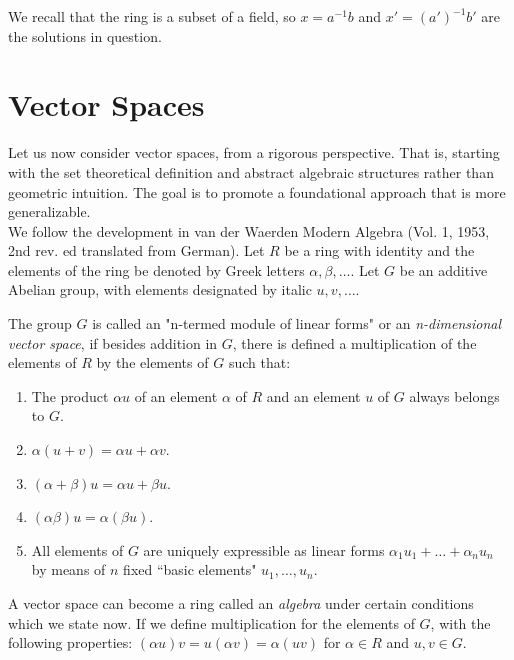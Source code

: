 We recall that the ring is a subset of a field, so $x=a^{-1}b$ and $x'=\left(a'\right)^{-1}b'$ are the solutions in question.

\section{Vector Spaces}

Let us now consider vector spaces, from a rigorous perspective.  That is, starting with the set theoretical definition and abstract algebraic structures rather than geometric intuition.  The goal is to promote a foundational approach that is more generalizable.\\

We follow the development in van der Waerden Modern Algebra (Vol. 1, 1953, 2nd rev. ed translated from German).  Let $R$ be a ring with identity and the elements of the ring be denoted by Greek letters $\alpha, \beta, \ldots $.  Let $G$ be an additive Abelian group, with elements designated by italic $u,v, \ldots$.

The group $G$ is called an "n-termed module of linear forms" or an \textit{n-dimensional vector space}, if besides addition in $G$, there is defined a multiplication of the elements of $R$ by the elements of $G$ such that:\\

\begin{enumerate}
\item The product $\alpha u$ of an element $\alpha$ of $R$ and an element $u$ of $G$ always belongs to $G$.
\item $\alpha \left(u+v\right)=\alpha u + \alpha v$.
\item $\left(\alpha + \beta\right) u =\alpha u + \beta u$.
\item $\left(\alpha \beta \right)u=\alpha\left(\beta u\right)$.
\item All elements of $G$ are uniquely expressible as linear forms $\alpha_{1}u_{1}+\ldots+ \alpha_{n}u_{n}$ by means of $n$ fixed ``basic elements" $u_{1}, \ldots, u_{n}$.
\end{enumerate}

A vector space can become a ring called an \textit{algebra} under certain conditions which we state now.  If we define multiplication for the elements of $G$, with the following properties:  $\left(\alpha u\right)v=u\left(\alpha v\right)=\alpha\left(uv\right)$ for $\alpha \in R$ and $u,v \in G$.\\

